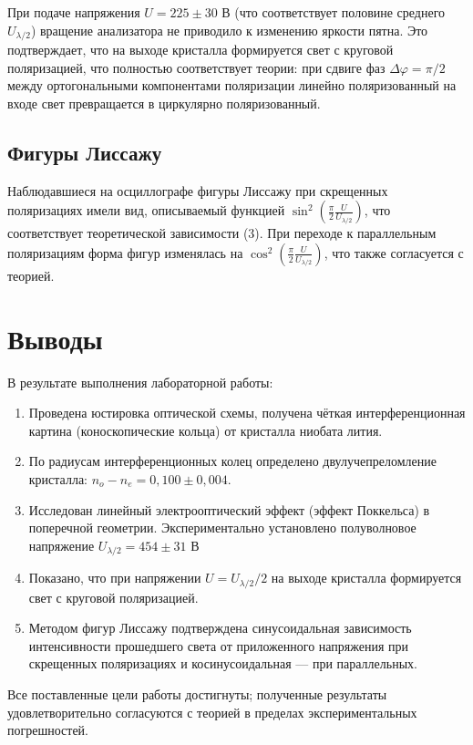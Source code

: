 \documentclass[a4paper]{article}
\begin{document}
При подаче напряжения $U = 225 \pm 30$ В (что соответствует половине среднего $U_{\lambda/2}$) вращение анализатора не приводило к изменению яркости пятна. Это подтверждает, что на выходе кристалла формируется свет с круговой поляризацией, что полностью соответствует теории: при сдвиге фаз $\Delta\varphi = \pi/2$ между ортогональными компонентами поляризации линейно поляризованный на входе свет превращается в циркулярно поляризованный.

\subsection*{Фигуры Лиссажу}

Наблюдавшиеся на осциллографе фигуры Лиссажу при скрещенных поляризациях имели вид, описываемый функцией $\sin^2(\frac{\pi}{2}\frac{U}{U_{\lambda/2}})$, что соответствует теоретической зависимости (3). При переходе к параллельным поляризациям форма фигур изменялась на $\cos^2(\frac{\pi}{2}\frac{U}{U_{\lambda/2}})$, что также согласуется с теорией.

\section{Выводы}

В результате выполнения лабораторной работы:

\begin{enumerate}
    \item Проведена юстировка оптической схемы, получена чёткая интерференционная картина (коноскопические кольца) от кристалла ниобата лития.
    \item По радиусам интерференционных колец определено двулучепреломление кристалла: $n_o - n_e = 0,100 \pm 0,004$.
    \item Исследован линейный электрооптический эффект (эффект Поккельса) в поперечной геометрии. Экспериментально установлено полуволновое напряжение $U_{\lambda/2} = 454 \pm 31$ В
    \item Показано, что при напряжении $U = U_{\lambda/2}/2$ на выходе кристалла формируется свет с круговой поляризацией.
    \item Методом фигур Лиссажу подтверждена синусоидальная зависимость интенсивности прошедшего света от приложенного напряжения при скрещенных поляризациях и косинусоидальная — при параллельных.
\end{enumerate}

Все поставленные цели работы достигнуты; полученные результаты удовлетворительно согласуются с теорией в пределах экспериментальных погрешностей.
\end{document}
